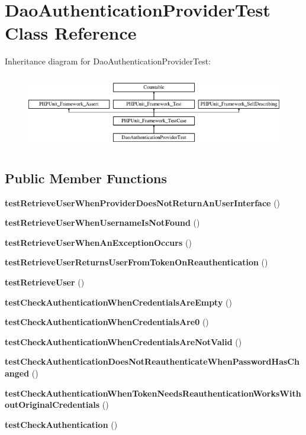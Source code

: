 \section{Dao\+Authentication\+Provider\+Test Class Reference}
\label{class_symfony_1_1_component_1_1_security_1_1_core_1_1_tests_1_1_authentication_1_1_provider_1_1_1f7033a15a93ecbe24ffca859aaace05}
Inheritance diagram for Dao\+Authentication\+Provider\+Test\+:\begin{figure}[H]
\begin{center}
\leavevmode
\includegraphics[height=3.303835cm]{class_symfony_1_1_component_1_1_security_1_1_core_1_1_tests_1_1_authentication_1_1_provider_1_1_1f7033a15a93ecbe24ffca859aaace05}
\end{center}
\end{figure}
\subsection*{Public Member Functions}
\begin{DoxyCompactItemize}
\item 
{\bf test\+Retrieve\+User\+When\+Provider\+Does\+Not\+Return\+An\+User\+Interface} ()
\item 
{\bf test\+Retrieve\+User\+When\+Username\+Is\+Not\+Found} ()
\item 
{\bf test\+Retrieve\+User\+When\+An\+Exception\+Occurs} ()
\item 
{\bf test\+Retrieve\+User\+Returns\+User\+From\+Token\+On\+Reauthentication} ()
\item 
{\bf test\+Retrieve\+User} ()
\item 
{\bf test\+Check\+Authentication\+When\+Credentials\+Are\+Empty} ()
\item 
{\bf test\+Check\+Authentication\+When\+Credentials\+Are0} ()
\item 
{\bf test\+Check\+Authentication\+When\+Credentials\+Are\+Not\+Valid} ()
\item 
{\bf test\+Check\+Authentication\+Does\+Not\+Reauthenticate\+When\+Password\+Has\+Changed} ()
\item 
{\bf test\+Check\+Authentication\+When\+Token\+Needs\+Reauthentication\+Works\+Without\+Original\+Credentials} ()
\item 
{\bf test\+Check\+Authentication} ()
\end{DoxyCompactItemize}
